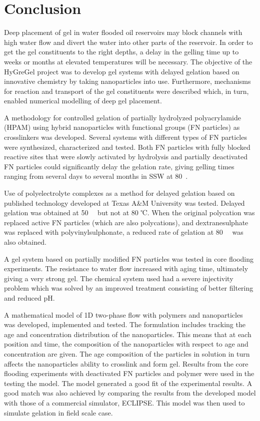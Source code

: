 \documentclass[nanomaterials,article,submit,moreauthors,pdftex]{Definitions/mdpi}
\begin{document}
\section{Conclusion}
Deep placement of gel in water flooded oil reservoirs may block channels with high water flow and divert the water into other parts of the reservoir. In order to get the gel constituents to the right depths, a delay in the gelling time up to weeks or months at elevated temperatures will be necessary. The objective of the HyGreGel project was to develop gel systems with delayed gelation based on innovative chemistry by taking nanoparticles into use. Furthermore, mechanisms for reaction and transport of the gel constituents were described which, in turn, enabled numerical modelling of deep gel placement.

A methodology for controlled gelation of partially hydrolyzed polyacrylamide (HPAM) using hybrid nanoparticles with functional groups (FN particles) as crosslinkers was developed. Several systems with different types of FN particles were synthesized, characterized and tested. Both FN particles with fully blocked reactive sites that were slowly activated by hydrolysis and partially deactivated FN particles could significantly delay the gelation rate, giving gelling times ranging from several days to several months in SSW at 80~\celsius.

Use of polyelectrolyte complexes as a method for delayed gelation based on published
technology developed at Texas A\&M University was tested. Delayed gelation was obtained at 50~\celsius~ but not at 80 ℃. When the original polycation was replaced  
active FN particles (which are also polycations), and dextranesulphate was replaced with polyvinylsulphonate, a reduced rate of gelation at 80~\celsius~ was also obtained.  

A gel system based on partially modified FN particles was tested in core flooding experiments. The resistance to water flow increased with aging time, ultimately giving a very strong gel. The chemical system used had a severe injectivity problem which was solved by an improved treatment consisting of better filtering and reduced pH.

A mathematical model of 1D two-phase flow with polymers and nanoparticles was developed, implemented and tested. The formulation includes tracking the age and concentration distribution of the nanoparticles. This means that at each position and time, the composition of the nanoparticles with respect to age and concentration are given. The age composition of the particles in solution in turn affects the nanoparticles ability to crosslink and form gel. Results from the core flooding experiments with deactivated FN particles and polymer were used in the testing the model. The model generated a good fit of the experimental results. A good match was also achieved by comparing the results from the developed model with those of a commercial simulator, ECLIPSE. This model was then used to simulate gelation in field scale case.
\end{document}
